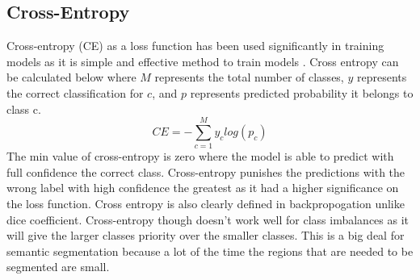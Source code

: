 \subsection{Cross-Entropy}
    Cross-entropy (CE) as a loss function has been used significantly in training models as it is simple and effective method to train models \cite{deBoer2005}. 
    Cross entropy can be calculated below where $M$ represents the total number of classes, $y$ represents the correct classification for $c$, and $p$ represents predicted probability it belongs to class c. 
\begin{equation}
 CE = -\sum_{c=1}^{M}{y_{c}log(p_{c})}  \label{eq:crossentropy} 
\end{equation}
    The min value of cross-entropy is zero where the model is able to predict with full confidence the correct class. 
    Cross-entropy punishes the predictions with the wrong label with high confidence the greatest as it had a higher significance on the loss function. 
    Cross entropy is also clearly defined in backpropogation unlike dice coefficient. 
    Cross-entropy though doesn't work well for class imbalances as it will give the larger classes priority over the smaller classes.
    This is a big deal for semantic segmentation because a lot of the time the regions that are needed to be segmented are small. 
